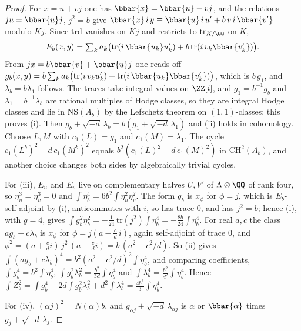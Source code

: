 \begin{proof}
For $x=u+vj$ one has $\bbar{x}=\bbar{u}-vj$, and the relations $ju=\bbar{u}j$,
$j^{2}=b$ give
$\bbar{x}\,i\,y\equiv\bbar{u}\,i\,u'+b\,v\,i\,\bbar{v'}$ modulo $Kj$. Since
$\mathrm{trd}$ vanishes on $Kj$ and restricts to $\mathrm{tr}_{K/\QQ}$ on $K$,
\[
  E_{b}(x,y)=\textstyle\sum_{k}a_{k}\bigl(\mathrm{tr}(i\,\bbar{u_{k}}u'_{k})
  +b\,\mathrm{tr}(i\,v_{k}\bbar{v'_{k}})\bigr).
\]
From $jx=b\bbar{v}+\bbar{u}j$ one reads off
$g_{b}(x,y)=b\sum_{k}a_{k}\bigl(\mathrm{tr}(i\,v_{k}u'_{k})
+\mathrm{tr}(i\,\bbar{u_{k}}\bbar{v'_{k}})\bigr)$, which is $b\,g_{1}$, and
$\lambda_{b}=b\lambda_{1}$ follows. The traces take integral values on
$\ZZ[i]$, and $g_{1}=b^{-1}g_{b}$ and $\lambda_{1}=b^{-1}\lambda_{b}$ are
rational multiples of Hodge classes, so they are integral Hodge classes and
lie in $\mathrm{NS}(A_{b})$ by the Lefschetz theorem on $(1,1)$-classes; this
proves (i). Then
$g_{b}+\sqrt{-d}\,\lambda_{b}=b(g_{1}+\sqrt{-d}\,\lambda_{1})$ and (ii) holds
in cohomology. Choose $L,M$ with $c_{1}(L)=g_{1}$ and
$c_{1}(M)=\lambda_{1}$. The cycle $c_{1}(L^{b})^{2}-d\,c_{1}(M^{b})^{2}$ equals
$b^{2}(c_{1}(L)^{2}-d\,c_{1}(M)^{2})$ in $\mathrm{CH}^{2}(A_{b})$, and another
choice changes both sides by algebraically trivial cycles.

For (iii), $E_{u}$ and $E_{v}$ live on complementary halves $U,V'$ of
$\Lambda\otimes\QQ$ of rank four, so $\eta_{u}^{3}=\eta_{v}^{3}=0$ and
$\int\eta_{b}^{4}=6b^{2}\int\eta_{u}^{2}\eta_{v}^{2}$. The form $g_{b}$ is
$x_{\phi}$ for $\phi=j$, which is $E_{b}$-self-adjoint by
(i), anticommutes with $i$, so has trace $0$, and has
$j^{2}=b$; hence (i), with $g=4$, gives
$\int g_{b}^{2}\eta_{b}^{2}=-\tfrac{1}{24}\,\mathrm{tr}(j^{2})\int\eta_{b}^{4}
=-\tfrac{8b}{24}\int\eta_{b}^{4}$. For real $a,c$ the class
$ag_{b}+c\lambda_{b}$ is $x_{\phi}$ for $\phi=j(a-\tfrac{c}{d}\,i)$, again
self-adjoint of trace $0$, and
$\phi^{2}=(a+\tfrac{c}{d}i)\,j^{2}\,(a-\tfrac{c}{d}i)=b\,(a^{2}+c^{2}/d)$.
So (ii) gives
$\int(ag_{b}+c\lambda_{b})^{4}=b^{2}(a^{2}+c^{2}/d)^{2}\int\eta_{b}^{4}$, and
comparing coefficients, $\int g_{b}^{4}=b^{2}\int\eta_{b}^{4}$,
$\int g_{b}^{2}\lambda_{b}^{2}=\tfrac{b^{2}}{3d}\int\eta_{b}^{4}$ and
$\int\lambda_{b}^{4}=\tfrac{b^{2}}{d^{2}}\int\eta_{b}^{4}$. Hence
$\int Z_{b}^{2}=\int g_{b}^{4}-2d\int g_{b}^{2}\lambda_{b}^{2}
+d^{2}\int\lambda_{b}^{4}=\tfrac{4b^{2}}{3}\int\eta_{b}^{4}$.

For (iv), $(\alpha j)^{2}=N(\alpha)b$, and
$g_{\alpha j}+\sqrt{-d}\,\lambda_{\alpha j}$ is $\alpha$ or $\bbar{\alpha}$
times $g_{j}+\sqrt{-d}\,\lambda_{j}$.
\end{proof}


